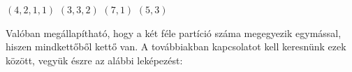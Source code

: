 \begin{solution}
\begin{center}
\par\end{center}
\begin{center}
\hspace{0.1cm} $(4,2,1,1)$ \hspace{0.9cm} $(3,3,2)$ \hspace{1.4cm}
$(7,1)$ \hspace{0.75cm} $(5,3)$
\par\end{center}
\begin{center}
\vspace{0.4cm}
\par\end{center}
Valóban megállapítható, hogy a két féle partíció száma megegyezik
egymással, hiszen mindkettőből kettő van. A továbbiakban kapcsolatot
kell keresnünk ezek között, vegyük észre az alábbi leképezést:

\vspace{0.2cm}


\end{solution}
